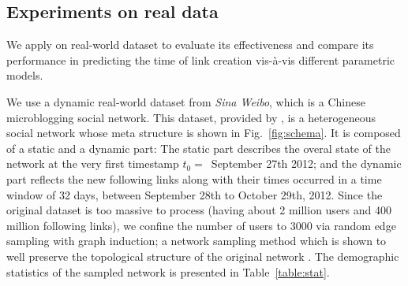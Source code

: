 \subsection{Experiments on real data}
We apply \npglm on real-world dataset to evaluate its effectiveness and compare its performance in predicting the time of link creation vis-\`a-vis different parametric models. 

 We use a dynamic real-world dataset from \emph{Sina Weibo}, which is a Chinese microblogging social network. This dataset, provided by \cite{zhang2013}, is a heterogeneous social network whose meta structure is shown in Fig.~\ref{fig:schema}. It is composed of a static and a dynamic part: The static part describes the overal state of the network at the very first timestamp $t_0=$~September 27th 2012; and the dynamic part reflects the new following links along with their times occurred in a time window of 32 days, between September 28th to October 29th, 2012. Since the original dataset is too massive to process (having about 2 million users and 400 million following links), we confine the number of users to 3000 via random edge sampling with graph induction; a network sampling method which is shown to well preserve the topological structure of the original network \cite{ahmed2013}. The demographic statistics of the sampled network is presented in Table~\ref{table:stat}.


